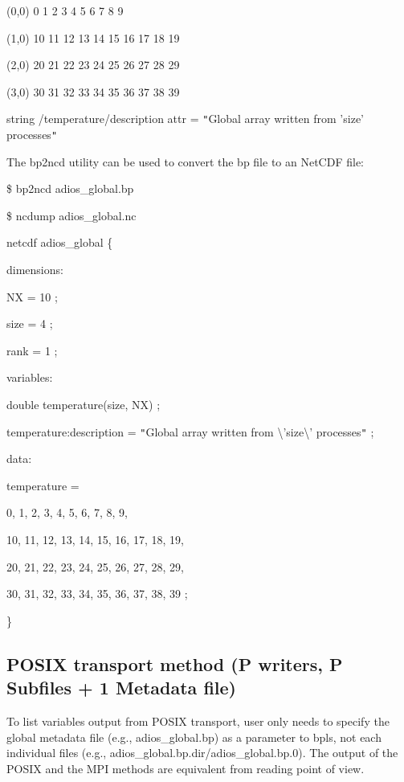 \parindent=14pt
(0,0)    0 1 2 3 4 5 6 7 8 9

(1,0)    10 11 12 13 14 15 16 17 18 19

\parindent=28pt
(2,0)    20 21 22 23 24 25 26 27 28 29

\parindent=14pt
(3,0)    30 31 32 33 34 35 36 37 38 39

\parindent=7pt
string     /temperature/description  attr   = \texttt{"}Global array written from 
'size' processes\texttt{"}

\parindent=0pt
The bp2ncd utility can be used to convert the bp file to an NetCDF file:

\$ bp2ncd adios\_global.bp

\$ ncdump adios\_global.nc 

netcdf adios\_global \{

dimensions:

\parindent=28pt
NX = 10 ;

size = 4 ;

\parindent=57pt
rank = 1 ;

\parindent=0pt
variables:

\parindent=28pt
double temperature(size, NX) ;

\parindent=57pt
temperature:description = \texttt{"}Global array written from \textbackslash{}'size\textbackslash{}' 
processes\texttt{"} ;

\parindent=0pt
data:

\parindent=3pt
temperature =

\parindent=7pt
0, 1, 2, 3, 4, 5, 6, 7, 8, 9,

10, 11, 12, 13, 14, 15, 16, 17, 18, 19,

\parindent=14pt
20, 21, 22, 23, 24, 25, 26, 27, 28, 29,

\parindent=7pt
30, 31, 32, 33, 34, 35, 36, 37, 38, 39 ;

\parindent=0pt
\}\label{HToc182553449}

\subsection{POSIX transport method (P writers, P Subfiles + 1 Metadata file)}

To list variables output from POSIX transport, user only needs to specify the global 
metadata file (e.g., adios\_global.bp) as a parameter to bpls, not each individual 
files (e.g., adios\_global.bp.dir/adios\_global.bp.0). The output of the POSIX 
and the MPI methods are equivalent from reading point of view. 

